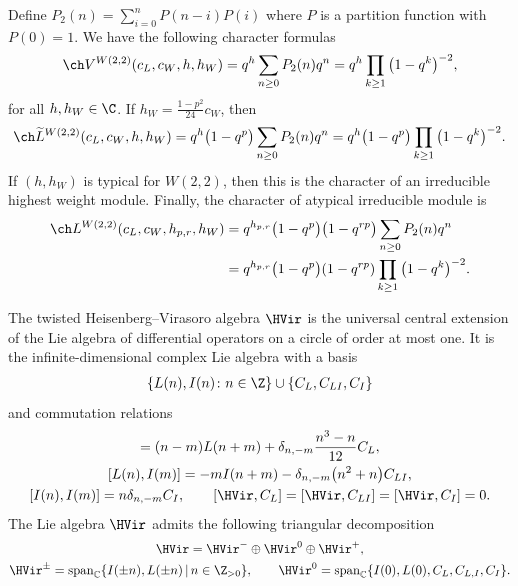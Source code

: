 Def\/ine $P_{2}(n) =\sum\limits_{i=0}^{n}P(n-i)P(i)$ where $P $ is a partition function with $P(0)=1$. We have the following character
formulas~\cite{R-JMP}
\begin{gather*}
\ch V^{W(2,2)}( c_{L},c_{W},h,h_{W}) =q^{h}\sum_{n\geq0}P_{2}(n)q^{n}=q^{h}\prod\limits_{k\geq1}\big(1-q^{k}\big)^{-2},
\end{gather*}
for all $h,h_W \in \C$. If $h_W = \frac{1-p^2}{24}c_W$, then
\begin{gather*}
\ch \widetilde{L}^{W(2,2)}(c_{L},c_{W},h,h_{W}) =q^{h}\big(1-q^{p}\big)\sum_{n\geq0}P_{2}(n)q^{n}
 =q^{h}\big(1-q^{p}\big)\prod\limits_{k\geq1}\big(1-q^{k}\big)^{-2}.
\end{gather*}
If $(h,h_W)$ is typical for $W(2,2)$, then this is the character of an irreducible highest weight module. Finally, the character of atypical irreducible module is
\begin{align*}
\ch L^{W(2,2)}( c_{L},c_{W},h_{p,r},h_{W})& =q^{h_{p,r}}\big(1-q^{p}\big)\big(1-q^{rp}\big)\sum_{n\geq0}P_{2}(n)q^{n} \\
& =q^{h_{p,r}}\big(1-q^{p}\big)(1-q^{rp})\prod\limits_{k\geq1}\big(1-q^{k}\big)^{-2}.
\end{align*}

The twisted Heisenberg--Virasoro algebra $\HVir$ is the universal central extension of the Lie algebra of dif\/ferential operators on a circle of order at most one. It is the inf\/inite-dimensional complex Lie algebra with a basis
\begin{gather*}
\{L(n),I(n)\colon n\in\Z\}\cup\{C_{L},C_{LI},C_{I}\}
\end{gather*}
and commutation relations
\begin{gather*}
[ L(n),L(m)] =(n-m)L(n+m)+\delta_{n,-m}\frac{n^{3}-n}{12}C_{L},\\
[ L(n),I(m)] =-mI(n+m)-\delta_{n,-m}\big(n^{2}+n\big)C_{LI}, \\
[ I(n),I(m)] =n\delta_{n,-m}C_{I}, \qquad
[ {\HVir},C_{L}] =[ {\HVir},C_{LI}] =[ \HVir,C_{I}] =0.
\end{gather*}
The Lie algebra $\HVir$ admits the following triangular decomposition
\begin{gather}
\HVir =\HVir ^{-} \oplus \HVir^0 \oplus \HVir^{+}, \label{triangular} \\
\HVir ^{\pm} = \operatorname{span}_{\mathbb C} \{ I( \pm n), L(\pm n) \,|\, n \in {\Z}_{>0}\}, \qquad
\HVir^0 = \operatorname{span}_{\mathbb C} \{ I(0), L(0), C_L, C_{L,I}, C_{I} \}. \nonumber
\end{gather}

